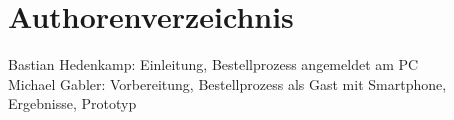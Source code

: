 \documentclass[	12pt, 
				a4paper, 
				BCOR=10mm, %
				DIV=12, 
				parskip=half, %
				headings=small, %
				twoside, %
				ngerman,
				bibliography=totoc,index=totoc, listof=totoc,
				numbers=noendperiod
				]{scrbook} %
\theoremstyle{plain}%
\theoremstyle{definition}
\theoremstyle{remark}
\begin{document}

\newpage
 \printbibliography	%

\appendix 				%

\newpage
\chapter{Authorenverzeichnis}
Bastian Hedenkamp: Einleitung, Bestellprozess angemeldet am PC\\
Michael Gabler: Vorbereitung, Bestellprozess als Gast mit Smartphone, Ergebnisse, Prototyp 
\end{document}
